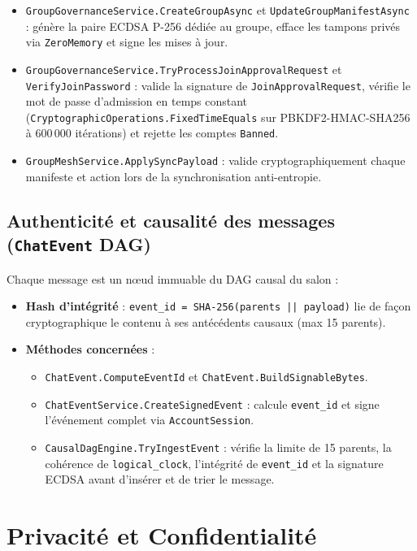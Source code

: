 \documentclass[11pt,a4paper]{article}
\begin{document}
\begin{itemize}
\begin{itemize}
        \item \texttt{GroupGovernanceService.CreateGroupAsync} et \texttt{UpdateGroupManifestAsync} : génère la paire ECDSA P-256 dédiée au groupe, efface les tampons privés via \texttt{ZeroMemory} et signe les mises à jour.
        \item \texttt{GroupGovernanceService.TryProcessJoinApprovalRequest} et \texttt{VerifyJoinPassword} : valide la signature de \texttt{JoinApprovalRequest}, vérifie le mot de passe d'admission en temps constant (\texttt{CryptographicOperations.FixedTimeEquals} sur PBKDF2-HMAC-SHA256 à 600\,000 itérations) et rejette les comptes \texttt{Banned}.
        \item \texttt{GroupMeshService.ApplySyncPayload} : valide cryptographiquement chaque manifeste et action lors de la synchronisation anti-entropie.
    \end{itemize}
\end{itemize}

\subsection{Authenticité et causalité des messages (\texttt{ChatEvent} DAG)}
Chaque message est un nœud immuable du DAG causal du salon :
\begin{itemize}
    \item \textbf{Hash d'intégrité} : \texttt{event\_id = SHA-256(parents || payload)} lie de façon cryptographique le contenu à ses antécédents causaux (max 15 parents).
    \item \textbf{Méthodes concernées} :
    \begin{itemize}
        \item \texttt{ChatEvent.ComputeEventId} et \texttt{ChatEvent.BuildSignableBytes}.
        \item \texttt{ChatEventService.CreateSignedEvent} : calcule \texttt{event\_id} et signe l'événement complet via \texttt{AccountSession}.
        \item \texttt{CausalDagEngine.TryIngestEvent} : vérifie la limite de 15 parents, la cohérence de \texttt{logical\_clock}, l'intégrité de \texttt{event\_id} et la signature ECDSA avant d'insérer et de trier le message.
    \end{itemize}
\end{itemize}

\section{Privacité et Confidentialité}
\end{document}
